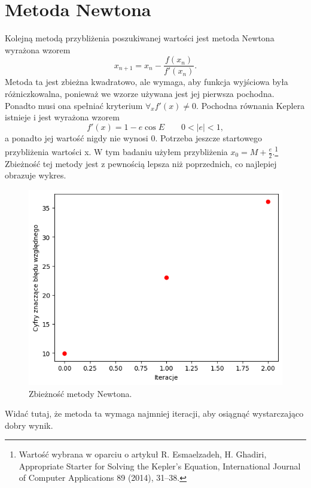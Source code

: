 \documentclass[11pt,wide]{mwart}
\begin{document}
\section{Metoda Newtona} \label{Newton}
Kolejną metodą przybliżenia poszukiwanej wartości jest metoda Newtona wyrażona wzorem
\begin{equation}
x_{n+1} = x_n - \frac{f(x_n)}{f'(x_n)}.
\end{equation}
Metoda ta jest zbieżna kwadratowo, ale wymaga, aby funkcja wyjściowa była różniczkowalna, ponieważ we wzorze używana jest jej pierwsza pochodna. Ponadto musi ona spełniać kryterium $\forall_{x} f'(x) \ne 0$. Pochodna równania Keplera istnieje i jest wyrażona wzorem
\begin{equation}
f'(x) = 1 - e \cos E \qquad 0 < |e| < 1,
\end{equation}
a ponadto jej wartość nigdy nie wynosi 0. Potrzeba jeszcze startowego przybliżenia wartości x. W tym badaniu użyłem przybliżenia $x_0 = M + \frac{e}{2}$.\footnote{Wartość wybrana w oparciu o artykuł  R. Esmaelzadeh, H. Ghadiri, Appropriate Starter for Solving the Kepler’s Equation, International Journal of Computer Applications 89 (2014), 31–38.} \\
Zbieżność tej metody jest z pewnością lepsza niż poprzednich, co najlepiej obrazuje wykres. \\
\begin{figure}[H]
	\begin{center}
	\includegraphics[scale=0.6]{newton}
	\end{center}
	\caption{Zbieżność metody Newtona.}
\end{figure}
\noindent Widać tutaj, że metoda ta wymaga najmniej iteracji, aby osiągnąć wystarczająco dobry wynik.\\
\end{document}
